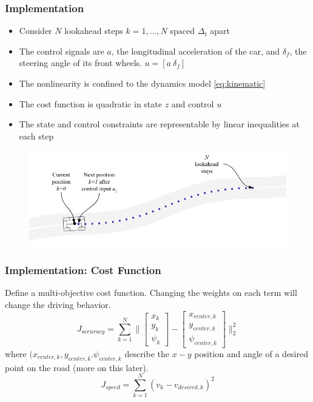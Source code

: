 \documentclass{beamer}
\begin{document}
\begin{frame}
\frametitle{Implementation}
\begin{itemize}
\item Consider $N$ lookahead steps $k=1,\dots,N$ spaced $\Delta_t$ apart
\item The control signals are $a$, the longitudinal acceleration of the car, and $\delta_f$, the steering angle of its front wheels. $u = [a\ \delta_f]$
\item The nonlinearity is confined to the dynamics model \eqref{eq:kinematic}
\item The cost function is quadratic in state $z$ and control $u$
\item The state and control constraints are representable by linear inequalities at each step
\end{itemize}
\vspace{-1.0em}
\begin{figure}
	\includegraphics[width=0.9\linewidth]{figures/mpc_figure.png}
\end{figure}
\end{frame}



\begin{frame}
\frametitle{Implementation: Cost Function}
Define a multi-objective cost function. Changing the weights on each term will change the driving behavior.
\begin{equation}
J_{accuracy} = \sum_{k=1}^N\Big\| \begin{bmatrix}
x_k\\y_k\\\psi_k
\end{bmatrix} - \begin{bmatrix}
x_{center,k}\\y_{center,k}\\\psi_{center,k}
\end{bmatrix} \Big\|_2^2
\label{eq:costcenter}
\end{equation}
where $(x_{center,k}, y_{center,k}. \psi_{center,k}$ describe the $x-y$ position and angle of a desired point on the road (more on this later).
\begin{equation}
J_{speed} = \sum_{k=1}^N (v_k - v_{desired,k})^2
\label{eq:speed}
\end{equation}
\end{frame}
\end{document}
